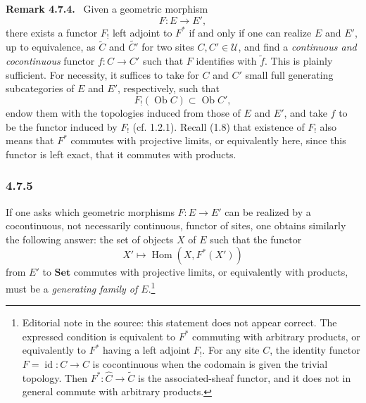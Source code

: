 \documentclass[11pt]{article}
\newcommand{\U}{\mathcal{U}}
\newcommand{\Set}{\mathbf{Set}}
\newcommand{\Hom}{\operatorname{Hom}}
\newcommand{\Ob}{\operatorname{Ob}}
\newenvironment{remarktext}[1]{\par\medskip\noindent\textbf{#1.}\ }{\par\medskip}
\begin{document}
\begin{remarktext}{Remark 4.7.4}
Given a geometric morphism
\[
F:E\longrightarrow E',
\]
there exists a functor \(F_!\) left adjoint to \(F^\ast\) if and only if one can realize \(E\) and \(E'\), up to equivalence, as \(\widetilde C\) and \(\widetilde{C'}\) for two sites \(C,C'\in\U\), and find a \emph{continuous and cocontinuous} functor \(f:C\to C'\) such that \(F\) identifies with \(\widetilde f\). This is plainly sufficient. For necessity, it suffices to take for \(C\) and \(C'\) small full generating subcategories of \(E\) and \(E'\), respectively, such that
\[
F_!(\Ob C)\subset \Ob C',
\]
endow them with the topologies induced from those of \(E\) and \(E'\), and take \(f\) to be the functor induced by \(F_!\) (cf. 1.2.1). Recall (1.8) that existence of \(F_!\) also means that \(F^\ast\) commutes with projective limits, or equivalently here, since this functor is left exact, that it commutes with products.
\end{remarktext}

\subsubsection*{4.7.5}
If one asks which geometric morphisms \(F:E\to E'\) can be realized by a cocontinuous, not necessarily continuous, functor of sites, one obtains similarly the following answer: the set of objects \(X\) of \(E\) such that the functor
\[
X'\longmapsto\Hom(X,F^\ast(X'))
\]
from \(E'\) to \(\Set\) commutes with projective limits, or equivalently with products, must be a \emph{generating family of \(E\)}.\footnote{Editorial note in the source: this statement does not appear correct. The expressed condition is equivalent to \(F^\ast\) commuting with arbitrary products, or equivalently to \(F^\ast\) having a left adjoint \(F_!\). For any site \(C\), the identity functor \(F=\operatorname{id}:C\to C\) is cocontinuous when the codomain is given the trivial topology. Then \(F^\ast:\widehat C\to\widetilde C\) is the associated-sheaf functor, and it does not in general commute with arbitrary products.}
\end{document}
